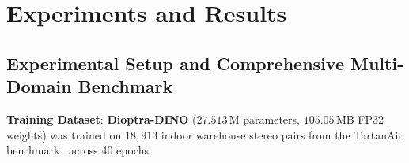 
\section{Experiments and Results}
\label{sec:experiments}

\subsection{Experimental Setup and Comprehensive Multi-Domain Benchmark}
\label{sec:experiments_setup}

\noindent\textbf{Training Dataset}: \textbf{Dioptra-DINO} ($27.513$\,M parameters, $105.05$\,MB FP32 weights) was trained on $18,913$ indoor warehouse stereo pairs from the TartanAir benchmark~\cite{wang2020tartanair} across 40 epochs.

